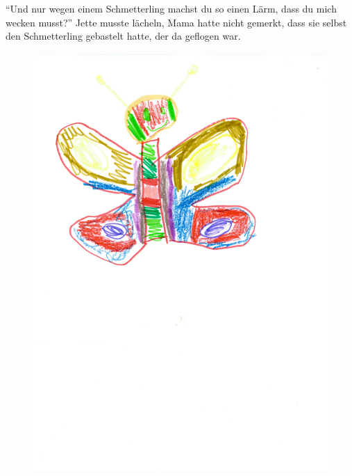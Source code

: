 \enquote{Und nur wegen einem Schmetterling machst du so einen Lärm, dass du mich wecken musst?} Jette musste lächeln, Mama hatte nicht gemerkt, dass sie selbst den Schmetterling gebastelt hatte, der da geflogen war. \hfill {\color{red}\decofourleft}
\begin{figure}[ht]
\centering
\includegraphics[scale=0.5]{pinarella.pdf}
\end{figure}

